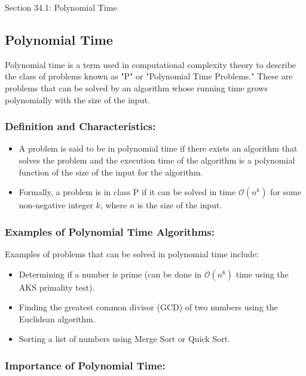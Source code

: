 \begin{notes}{Section 34.1: Polynomial Time}
    \subsection*{Polynomial Time}

    Polynomial time is a term used in computational complexity theory to describe the class of problems known as "P" or "Polynomial Time Problems." These are problems that can be solved by an algorithm 
    whose running time grows polynomially with the size of the input. \vspace*{1em}
    
    \subsubsection*{Definition and Characteristics:}
    
    \begin{itemize}
        \item A problem is said to be in polynomial time if there exists an algorithm that solves the problem and the execution time of the algorithm is a polynomial function of the size of the input 
        for the algorithm.
        \item Formally, a problem is in class P if it can be solved in time $\mathcal{O}(n^k)$ for some non-negative integer $k$, where $n$ is the size of the input.
    \end{itemize}
    
    \subsubsection*{Examples of Polynomial Time Algorithms:}
    
    Examples of problems that can be solved in polynomial time include:
    \begin{itemize}
        \item Determining if a number is prime (can be done in $\mathcal{O}(n^6)$ time using the AKS primality test).
        \item Finding the greatest common divisor (GCD) of two numbers using the Euclidean algorithm.
        \item Sorting a list of numbers using Merge Sort or Quick Sort.
    \end{itemize}
    
    \subsubsection*{Importance of Polynomial Time:}
    

\end{notes}
